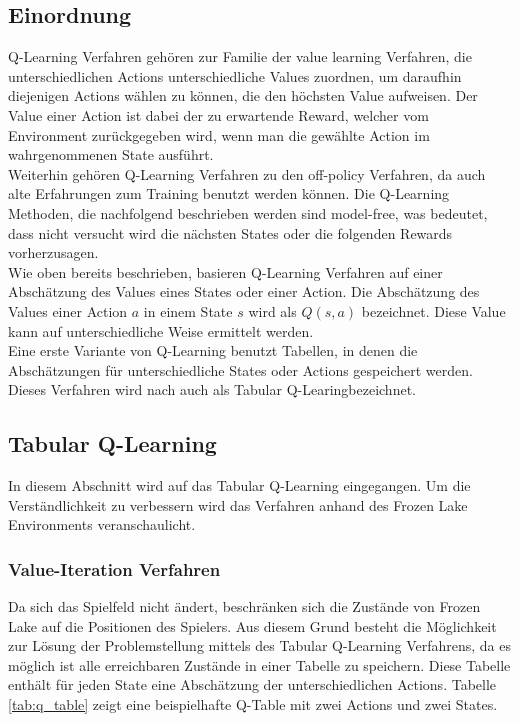 \documentclass[11pt]{scrartcl}
\begin{document}
\subsection{Einordnung}
Q-Learning Verfahren gehören zur Familie der value learning Verfahren, die
unterschiedlichen Actions unterschiedliche Values zuordnen, um daraufhin diejenigen Actions
wählen zu können, die den höchsten Value aufweisen. Der Value einer Action ist dabei der
zu erwartende Reward, welcher vom Environment zurückgegeben wird, wenn man die gewählte
Action im wahrgenommenen State ausführt.\\
Weiterhin gehören Q-Learning Verfahren zu den off-policy Verfahren, da auch alte
Erfahrungen zum Training benutzt werden können. Die Q-Learning Methoden, die nachfolgend
beschrieben werden sind model-free, was bedeutet, dass nicht versucht wird die nächsten
States oder die folgenden Rewards vorherzusagen.\\
Wie oben bereits beschrieben, basieren Q-Learning Verfahren auf einer Abschätzung des
Values eines States oder einer Action. Die Abschätzung des Values einer Action $a$ in
einem State $s$ wird als $Q(s, a)$ bezeichnet. Diese Value kann auf unterschiedliche
Weise ermittelt werden.\\
Eine erste Variante von Q-Learning benutzt Tabellen, in denen die Abschätzungen
für unterschiedliche States oder Actions gespeichert werden. Dieses Verfahren wird nach
\cite[~S.193]{L2018} auch als \grqq Tabular Q-Learing\grqq bezeichnet.


\subsection{Tabular Q-Learning}
In diesem Abschnitt wird auf das Tabular Q-Learning eingegangen. Um die
Ver\-ständ\-lich\-keit zu verbessern wird das Verfahren anhand des Frozen Lake
Environments veranschaulicht.


\subsubsection{Value-Iteration Verfahren}
Da sich das Spielfeld nicht ändert, beschränken sich die Zustände von Frozen Lake auf die
Positionen des Spielers. Aus diesem Grund besteht die Möglichkeit zur Lösung der Problemstellung
mittels des Tabular Q-Learning Verfahrens, da es möglich ist alle erreichbaren Zustände in einer
Tabelle zu speichern. Diese Tabelle enthält für jeden State eine Abschätzung der unterschiedlichen
Actions. Tabelle \ref{tab:q_table} zeigt eine beispielhafte Q-Table mit zwei Actions und zwei States.
\end{document}

